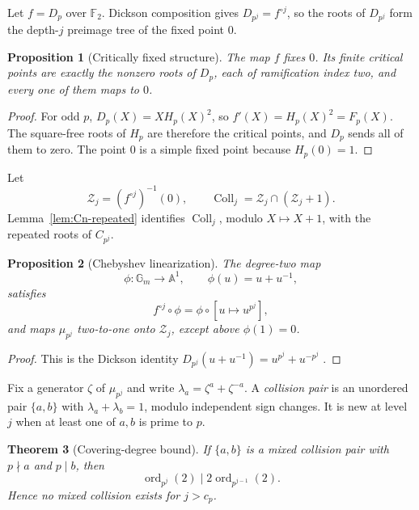 \documentclass[a4paper]{article}
\newtheorem{theorem}{Theorem}[section]
\newtheorem{proposition}[theorem]{Proposition}
\newcommand{\F}{\mathbb{F}}
\newcommand{\ord}[2][]{\operatorname{ord}_{#1}\!\left(#2\right)}
\begin{document}
Let $f=D_p$ over $\F_2$.  Dickson composition gives
$D_{p^j}=f^{\circ j}$, so the roots of $D_{p^j}$ form the depth-$j$
preimage tree of the fixed point $0$.

\begin{proposition}[Critically fixed structure]\label{prop:dynamics-critical}
	The map $f$ fixes $0$.  Its finite critical points are exactly the
	nonzero roots of $D_p$, each of ramification index two, and every one
	of them maps to $0$.
\end{proposition}

\begin{proof}
	For odd $p$, $D_p(X)=XH_p(X)^2$, so
	$f'(X)=H_p(X)^2=F_p(X)$.  The square-free roots of $H_p$ are therefore
	the critical points, and $D_p$ sends all of them to zero.  The point
	$0$ is a simple fixed point because $H_p(0)=1$.
\end{proof}

Let
\[
	\mathcal Z_j=(f^{\circ j})^{-1}(0),\qquad
	\operatorname{Coll}_j=\mathcal Z_j\cap(\mathcal Z_j+1).
\]
Lemma~\ref{lem:Cn-repeated} identifies $\operatorname{Coll}_j$, modulo
$X\mapsto X+1$, with the repeated roots of $C_{p^j}$.

\begin{proposition}[Chebyshev linearization]\label{prop:dynamics-linearization}
	The degree-two map
	\[
		\phi:\mathbb G_m\longrightarrow\mathbb A^1,
		\qquad \phi(u)=u+u^{-1},
	\]
	satisfies
	\[
		f^{\circ j}\circ\phi=\phi\circ[u\mapsto u^{p^j}],
	\]
	and maps $\mu_{p^j}$ two-to-one onto $\mathcal Z_j$, except above
	$\phi(1)=0$.
\end{proposition}

\begin{proof}
	This is the Dickson identity
	$D_{p^j}(u+u^{-1})=u^{p^j}+u^{-p^j}$
	\cite{lidl-dickson}.
\end{proof}

Fix a generator $\zeta$ of $\mu_{p^j}$ and write
$\lambda_a=\zeta^a+\zeta^{-a}$.  A \emph{collision pair} is an unordered
pair $\{a,b\}$ with $\lambda_a+\lambda_b=1$, modulo independent sign
changes.  It is new at level $j$ when at least one of $a,b$ is prime to
$p$.

\begin{theorem}[Covering-degree bound]\label{thm:dynamics-covering}
	If $\{a,b\}$ is a mixed collision pair with $p\nmid a$ and $p\mid b$,
	then
	\[
		\ord[p^j]{2}\mid2\ord[p^{j-1}]{2}.
	\]
	Hence no mixed collision exists for $j>c_p$.
\end{theorem}
\end{document}
